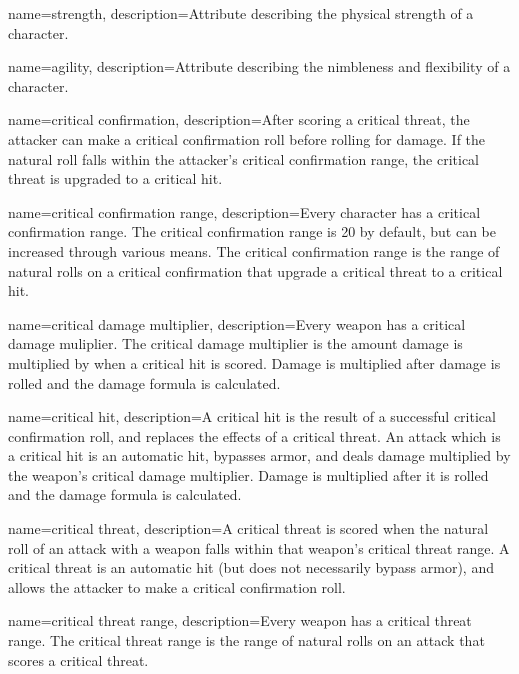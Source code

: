 {
    name=strength,
    description={Attribute describing the physical strength of a character.}
}

{
    name=agility,
    description={Attribute describing the nimbleness and flexibility of a
        character.}
}

{
    name={critical confirmation},
    description={After scoring a critical threat, the attacker can make a
    critical confirmation roll before rolling for damage. If the natural roll
    falls within the attacker's critical confirmation range, the critical
    threat is upgraded to a critical hit.}
}

{
    name={critical confirmation range},
    description={Every character has a critical confirmation range. The
    critical confirmation range is 20 by default, but can be increased through
    various means. The critical confirmation range is the range of natural
    rolls on a critical confirmation that upgrade a critical threat to a
    critical hit.}
}

{
    name={critical damage multiplier},
    description={Every weapon has a critical damage muliplier. The critical
    damage multiplier is the amount damage is multiplied by when a critical
    hit is scored. Damage is multiplied after damage is rolled and the damage
    formula is calculated.}
}

{
    name={critical hit},
    description={A critical hit is the result of a successful critical
    confirmation roll, and replaces the effects of a critical threat. An attack
    which is a critical hit is an automatic hit, bypasses armor, and deals
    damage multiplied by the weapon's critical damage multiplier. Damage is
    multiplied after it is rolled and the damage formula is calculated.}
}

{
    name={critical threat},
    description={A critical threat is scored when the natural roll of an attack
    with a weapon falls within that weapon's critical threat range. A critical
    threat is an automatic hit (but does not necessarily bypass armor), and
    allows the attacker to make a critical confirmation roll.}
}

{
    name={critical threat range},
    description={Every weapon has a critical threat range. The critical threat
    range is the range of natural rolls on an attack that scores a critical
    threat.}
}


